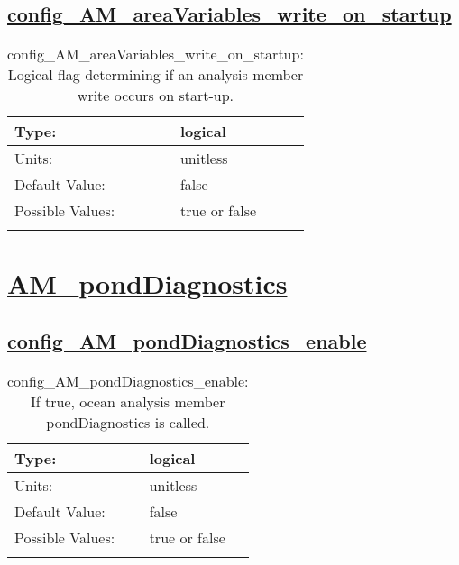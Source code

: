 \subsection[config\_AM\_areaVariables\_write\_on\_startup]{\hyperref[sec:nm_tab_AM_areaVariables]{config\_AM\_areaVariables\_write\_on\_startup}}
\label{subsec:nm_sec_config_AM_areaVariables_write_on_startup}
\begin{center}
\begin{longtable}{| p{2.0in} || p{4.0in} |}
    \hline
    Type: & logical \\
    \hline
    Units: & \si{unitless} \\
    \hline
    Default Value: & false \\
    \hline
    Possible Values: & true or false \\
    \hline
    \caption{config\_AM\_areaVariables\_write\_on\_startup: Logical flag determining if an analysis member write occurs on start-up.}
\end{longtable}
\end{center}
\section[AM\_pondDiagnostics]{\hyperref[sec:nm_tab_AM_pondDiagnostics]{AM\_pondDiagnostics}}
\label{sec:nm_sec_AM_pondDiagnostics}
\subsection[config\_AM\_pondDiagnostics\_enable]{\hyperref[sec:nm_tab_AM_pondDiagnostics]{config\_AM\_pondDiagnostics\_enable}}
\label{subsec:nm_sec_config_AM_pondDiagnostics_enable}
\begin{center}
\begin{longtable}{| p{2.0in} || p{4.0in} |}
    \hline
    Type: & logical \\
    \hline
    Units: & \si{unitless} \\
    \hline
    Default Value: & false \\
    \hline
    Possible Values: & true or false \\
    \hline
    \caption{config\_AM\_pondDiagnostics\_enable: If true, ocean analysis member pondDiagnostics is called.}
\end{longtable}
\end{center}
